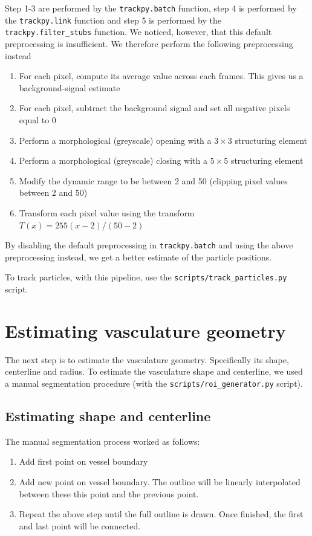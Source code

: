 \documentclass{article}
\begin{document}
Step 1-3 are performed by the \texttt{trackpy.batch} function, step 4 is performed by the \texttt{trackpy.link} function and step 5 is performed by the \texttt{trackpy.filter\_stubs} function. We noticed, however, that this default preprocessing is insufficient. We therefore perform the following preprocessing instead

\begin{enumerate}
    \item For each pixel, compute its average value across each frames. This gives us a background-signal estimate
    \item For each pixel, subtract the background signal and set all negative pixels equal to 0
    \item Perform a morphological (greyscale) opening with a $3\times3$ structuring element
    \item Perform a morphological (greyscale) closing with a $5\times5$ structuring element
    \item Modify the dynamic range to be between 2 and 50 (clipping pixel values between 2 and 50)
    \item Transform each pixel value using the transform $T(x) = 255  (x - 2)/(50 - 2)$
\end{enumerate}

By disabling the default preprocessing in \texttt{trackpy.batch} and using the above preprocessing instead, we get a better estimate of the particle positions. 

To track particles, with this pipeline, use the \texttt{scripts/track\_particles.py} script.

\section{Estimating vasculature geometry}
The next step is to estimate the vasculature geometry. Specifically its shape, centerline and radius. To estimate the vasculature shape and centerline, we used a manual segmentation procedure (with the \texttt{scripts/roi\_generator.py} script).

\subsection{Estimating shape and centerline}
The manual segmentation process worked as follows:

\begin{enumerate}
    \item Add first point on vessel boundary
    \item Add new point on vessel boundary. The outline will be linearly interpolated between these this point and the previous point. 
    \item Repeat the above step until the full outline is drawn. Once finished, the first and last point will be connected.
\end{enumerate}
\end{document}
